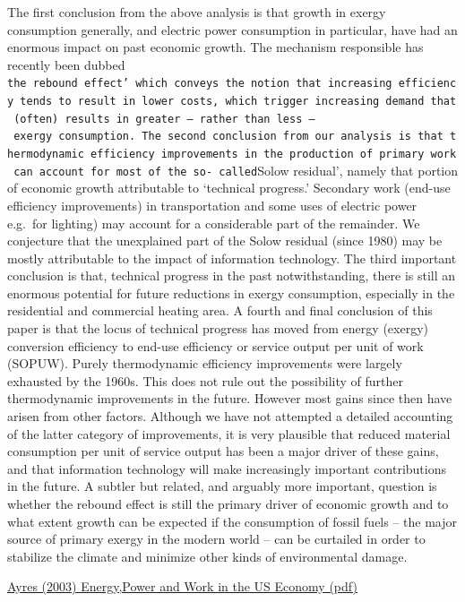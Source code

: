 \documentclass[
]{book}
\begin{document}
The first conclusion from the above analysis is that growth in exergy consumption
generally, and electric power consumption in particular, have had an enormous
impact on past economic growth. The mechanism responsible has recently been
dubbed \texttt{the\ rebound\ effect’\ which\ conveys\ the\ notion\ that\ increasing\ efficiency\ tends\ to\ result\ in\ lower\ costs,\ which\ trigger\ increasing\ demand\ that\ (often)\ results\ in\ greater\ –\ rather\ than\ less\ –\ exergy\ consumption.\ The\ second\ conclusion\ from\ our\ analysis\ is\ that\ thermodynamic\ efficiency\ improvements\ in\ the\ production\ of\ primary\ work\ can\ account\ for\ most\ of\ the\ so-\ called}Solow residual', namely that portion of economic growth attributable to
`technical progress.' Secondary work (end-use efficiency improvements) in
transportation and some uses of electric power e.g.~for lighting) may account for a
considerable part of the remainder. We conjecture that the unexplained part of the
Solow residual (since 1980) may be mostly attributable to the impact of information
technology.
The third important conclusion is that, technical progress in the past
notwithstanding, there is still an enormous potential for future reductions in exergy
consumption, especially in the residential and commercial heating area.
A fourth and final conclusion of this paper is that the locus of technical
progress has moved from energy (exergy) conversion efficiency to end-use efficiency
or service output per unit of work (SOPUW). Purely thermodynamic efficiency
improvements were largely exhausted by the 1960s. This does not rule out the
possibility of further thermodynamic improvements in the future. However most
gains since then have arisen from other factors. Although we have not attempted a
detailed accounting of the latter category of improvements, it is very plausible that
reduced material consumption per unit of service output has been a major driver of
these gains, and that information technology will make increasingly important
contributions in the future.
A subtler but related, and arguably more important, question is whether the
rebound effect is still the primary driver of economic growth and to what extent
growth can be expected if the consumption of fossil fuels -- the major source of
primary exergy in the modern world -- can be curtailed in order to stabilize the climate
and minimize other kinds of environmental damage.

\href{pdf/Ayres_2003_Exergy_Power_and_Work_US_1900-1998.pdf}{Ayres (2003) Energy,Power and Work in the US Economy (pdf)}
\end{document}

